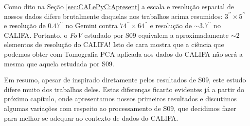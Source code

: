Como dito na Seção \ref{sec:CALePyC:Apresent} a escala e resolução espacial de nossos dados difere brutalmente daquelas
nos trabalhos acima resumidos: $3^{\prime\prime} \times 5^{\prime\prime}$ e resolução de $0.47^{\prime\prime}$ no Gemini
contra $74^{\prime\prime} \times 64^{\prime\prime}$ e resolução de $\sim3.7^{\prime\prime}$ no CALIFA. Portanto, o {\em
FoV} estudado por S09 equivalem a aproximadamente $\sim2$ elementos de resolução do CALIFA! Isto de cara mostra que a
ciência que podemos obter com Tomografia PCA aplicada aos dados do CALIFA não será a mesma que aquela estudada por S09.

Em resumo, apesar de inspirado diretamente pelos resultados de S09, este estudo difere muito dos trabalhos deles. Estas
diferenças ficarão evidentes já a partir do próximo capítulo, onde apresentamos nossos primeiros resultados e discutimos
algumas variações com respeito ao processamento de S09, que decidimos fazer para melhor se adequar ao contexto de dados
do CALIFA.

